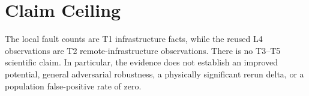 \documentclass[10pt]{article}
\begin{document}
\section{Claim Ceiling}

The local fault counts are T1 infrastructure facts, while the reused L4 observations are T2 remote-infrastructure observations. There is no T3--T5 scientific claim. In particular, the evidence does not establish an improved potential, general adversarial robustness, a physically significant rerun delta, or a population false-positive rate of zero.
\end{document}

